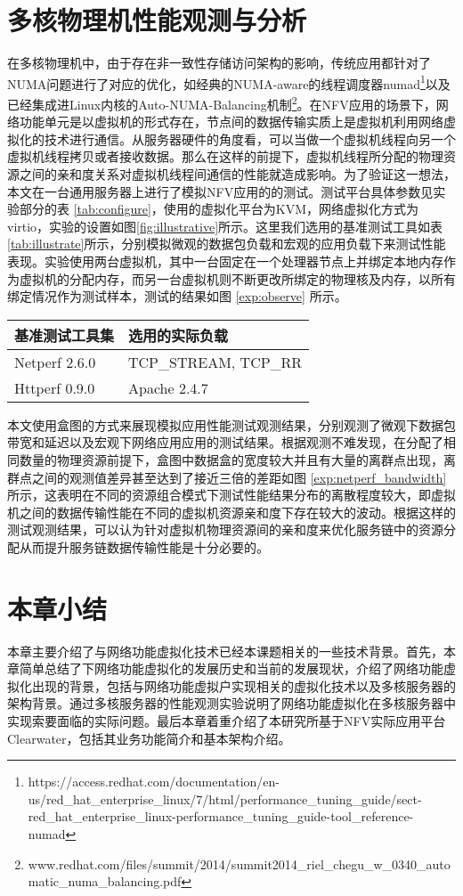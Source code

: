 \section{多核物理机性能观测与分析}
\label{related:observe}

在多核物理机中，由于存在非一致性存储访问架构的影响，传统应用都针对了NUMA问题进行了对应的优化，如经典的NUMA-aware的线程调度器numad\footnote{https://access.redhat.com/documentation/en-us/red\_hat\_enterprise\_linux/7/html/performance\_tuning\_guide/sect-red\_hat\_enterprise\_linux-performance\_tuning\_guide-tool\_reference-numad}以及已经集成进Linux内核的Auto-NUMA-Balancing机制\footnote{www.redhat.com/files/summit/2014/summit2014\_riel\_chegu\_w\_0340\_automatic\_numa\_balancing.pdf}。在NFV应用的场景下，网络功能单元是以虚拟机的形式存在，节点间的数据传输实质上是虚拟机利用网络虚拟化的技术进行通信。从服务器硬件的角度看，可以当做一个虚拟机线程向另一个虚拟机线程拷贝或者接收数据。那么在这样的前提下，虚拟机线程所分配的物理资源之间的亲和度关系对虚拟机线程间通信的性能就造成影响。为了验证这一想法，本文在一台通用服务器上进行了模拟NFV应用的的测试。测试平台具体参数见实验部分的表 \ref{tab:configure}，使用的虚拟化平台为KVM，网络虚拟化方式为virtio，实验的设置如图\ref{fig:illustrative}所示。这里我们选用的基准测试工具如表\ref{tab:illustrate}所示，分别模拟微观的数据包负载和宏观的应用负载下来测试性能表现。实验使用两台虚拟机，其中一台固定在一个处理器节点上并绑定本地内存作为虚拟机的分配内存，而另一台虚拟机则不断更改所绑定的物理核及内存，以所有绑定情况作为测试样本，测试的结果如图 \ref{exp:observe} 所示。


\begin{table}[htb]
	\centering
	\begin{tabular}{ | l | p{6cm} |}\hline
		\textbf{基准测试工具集} &							 \textbf{选用的实际负载}  				\\ 	\hline
		Netperf 2.6.0 	&  TCP\_STREAM, TCP\_RR	  \\ \hline
	    Httperf 0.9.0	&  Apache 2.4.7   \\ \hline
	\end{tabular}
\end{table}

本文使用盒图的方式来展现模拟应用性能测试观测结果，分别观测了微观下数据包带宽和延迟以及宏观下网络应用应用的测试结果。根据观测不难发现，在分配了相同数量的物理资源前提下，盒图中数据盒的宽度较大并且有大量的离群点出现，离群点之间的观测值差异甚至达到了接近三倍的差距如图 \ref{exp:netperf_bandwidth} 所示，这表明在不同的资源组合模式下测试性能结果分布的离散程度较大，即虚拟机之间的数据传输性能在不同的虚拟机资源亲和度下存在较大的波动。根据这样的测试观测结果，可以认为针对虚拟机物理资源间的亲和度来优化服务链中的资源分配从而提升服务链数据传输性能是十分必要的。

\section{本章小结}
本章主要介绍了与网络功能虚拟化技术已经本课题相关的一些技术背景。首先，本章简单总结了下网络功能虚拟化的发展历史和当前的发展现状，介绍了网络功能虚拟化出现的背景，包括与网络功能虚拟户实现相关的虚拟化技术以及多核服务器的架构背景。通过多核服务器的性能观测实验说明了网络功能虚拟化在多核服务器中实现索要面临的实际问题。最后本章着重介绍了本研究所基于NFV实际应用平台Clearwater，包括其业务功能简介和基本架构介绍。